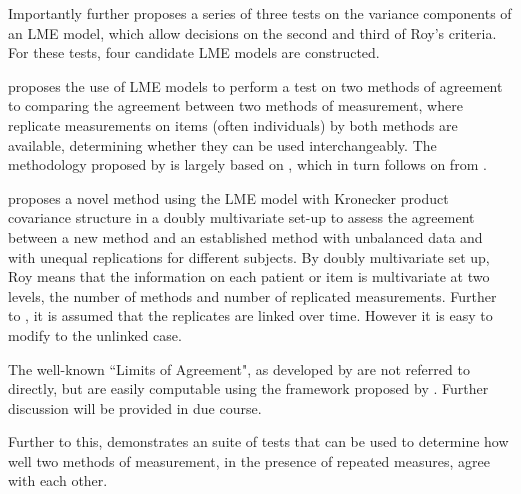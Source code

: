 \documentclass[12pt, a4paper]{report}
\theoremstyle{plain}
\theoremstyle{definition}
\theoremstyle{remark}
\begin{document}
	Importantly \citet{ARoy2009} further proposes a series of three tests on the variance components of an LME model, which allow decisions on the second and third of Roy's criteria. For these tests, four candidate LME models are constructed. 
	
	\citet{ARoy2009} proposes the use of LME models to perform a test on two methods of agreement to comparing the agreement between two methods of measurement, where replicate measurements on items (often individuals) by both methods are available, determining whether they can be used
	interchangeably. The methodology proposed by \citet{ARoy2009} is largely based on \citet{hamlett}, which in turn follows on from \citet{lam}.
	
	\citet{ARoy2009} proposes a novel method using the LME model with Kronecker product covariance structure in a doubly multivariate set-up to assess the agreement between a new method and an established method with unbalanced data and with unequal replications for different subjects. By doubly multivariate set up, Roy means that the information on each patient or item is multivariate at two levels, the number of methods and number of replicated measurements. Further to \citet{lam}, it is assumed that the replicates are linked over time. However it is easy to modify to the unlinked case.
	
	
	The well-known ``Limits of Agreement", as developed by \citet{BA86} are not referred to directly, but are easily computable using the framework proposed by \citet{ARoy2009}. Further discussion will be provided in due course.	
	
	
	
	
	
	
	Further to this, \citet{ARoy2009} demonstrates an suite of tests that can be used to determine how well two methods of measurement, in the presence of repeated measures, agree with each other.
	
\end{document}
